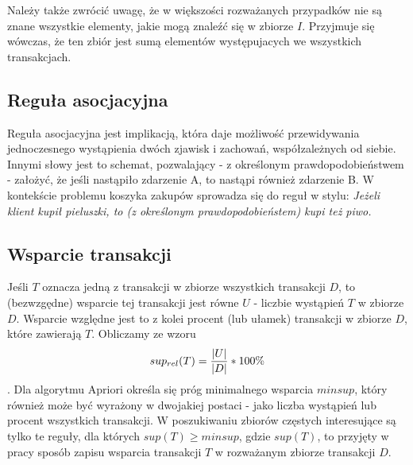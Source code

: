 Należy także zwrócić uwagę, że w większości rozważanych przypadków nie są znane wszystkie elementy, jakie mogą znaleźć się w zbiorze \(I\). Przyjmuje się wówczas, że ten zbiór jest sumą elementów występujacych we wszystkich transakcjach.

\subsection{Reguła asocjacyjna}
\label{c222}
Reguła asocjacyjna jest implikacją, która daje możliwość przewidywania jednoczesnego wystąpienia dwóch zjawisk i zachowań, współzależnych od siebie. Innymi słowy jest to schemat, pozwalający - z określonym prawdopodobieństwem - założyć, że jeśli nastąpiło zdarzenie A, to nastąpi również zdarzenie B. W kontekście problemu koszyka zakupów sprowadza się do reguł w stylu: \textit{Jeżeli klient kupił pieluszki, to (z określonym prawdopodobieństem) kupi też piwo.}

\subsection{Wsparcie transakcji}
\label{c223}
Jeśli \(T\) oznacza jedną z transakcji w zbiorze wszystkich transakcji \(D\), to (bezwzgędne) wsparcie tej transakcji jest równe \(U\) - liczbie wystąpień \(T\) w zbiorze \(D\). Wsparcie względne jest to z kolei procent (lub ułamek) transakcji w zbiorze \(D\), które zawierają \(T\). Obliczamy ze wzoru \[sup_{rel}(T)=\nolinebreak\frac{|U|}{|D|}*100\%\]. Dla algorytmu Apriori określa się próg minimalnego wsparcia \(minsup\), który również może być wyrażony w dwojakiej postaci - jako liczba wystąpień lub procent wszystkich transakcji. W poszukiwaniu zbiorów częstych interesujące są tylko te reguły, dla których \(sup(T) \geq minsup \), gdzie \(sup(T)\), to przyjęty w pracy sposób zapisu wsparcia transakcji \(T\) w rozważanym zbiorze transakcji \(D\).

